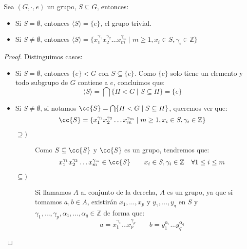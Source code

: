 \begin{prop}\label{prop:subgrupos_generados}
    Sea $(G,\cdot ,e)$ un grupo, $S\subseteq G$, entonces:
    \begin{itemize}
        \item Si $S = \emptyset $, entonces $\langle S \rangle = \{e\}$, el grupo trivial.
        \item Si $S\neq \emptyset $, entonces $\langle S \rangle = \{x_1^{\gamma_1}x_2^{\gamma_2}\ldots x_m^{\gamma_m} \mid m \geq 1, x_i \in S, \gamma_i \in \mathbb{Z}\}$
    \end{itemize} 
    \begin{proof}
        Distinguimos casos:
        \begin{itemize}
            \item Si $S=\emptyset $, entonces $\{e\} < G$ con $S\subseteq \{e\}$. Como $\{e\}$ solo tiene un elemento y todo subgrupo de $G$ contiene a $e$, concluimos que:
                \begin{equation*}
                    \langle S \rangle = \bigcap \{H < G \mid S \subseteq H\} = \{e\}
                \end{equation*}
            \item Si $S\neq \emptyset $, si notamos $\cc{S} = \bigcap \{H < G \mid S \subseteq H\}$, queremos ver que:
                \begin{equation*}
                    \cc{S} = \{x_1^{\gamma_1}x_2^{\gamma_2}\ldots x_m^{\gamma_m} \mid m \geq 1, x_i \in S, \gamma_i \in \mathbb{Z}\}
                \end{equation*}
                \begin{description}
                    \item [$\supseteq)$] Como $S\subseteq \cc{S}$ y $\cc{S}$ es un grupo, tendremos que:
                        \begin{equation*}
                            x_1^{\gamma_1}x_2^{\gamma_2}\ldots x_m^{\gamma_m} \in \cc{S} \qquad x_i \in S, \gamma_i \in \mathbb{Z}\quad \forall 1\leq i \leq m
                        \end{equation*}
                    \item [$\subseteq)$] Si llamamos $A$ al conjunto de la derecha, $A$ es un grupo, ya que si tomamos $a,b\in A$, existirán $x_1,\ldots,x_p$ y $y_1,\ldots,y_q$ en $S$ y $\gamma_1,\ldots,\gamma_p,\alpha_1,\ldots,\alpha_q\in \mathbb{Z}$ de forma que:
                        \begin{equation*}
                            a = x_1^{\gamma_1} \ldots x_p^{\gamma_p} \qquad b = y_1^{\alpha_1} \ldots y_q^{\alpha_q
}
\end{equation*}
\end{description}
\end{itemize}
\end{proof}
\end{prop}
